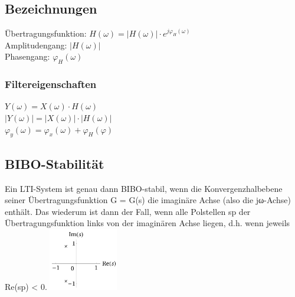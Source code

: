 \begin{multicols}{2}
    \subsection{Bezeichnungen}
    Übertragungsfunktion: $H(\omega)=|H(\omega)| \cdot e^{j\varphi_H(\omega)}$ \\
    Amplitudengang: $|H(\omega)|$ \\
    Phasengang: $\varphi_H(\omega)$ \\

    \subsubsection{Filtereigenschaften}
    $Y(\omega) = X(\omega) \cdot H(\omega)$ \\
    $|Y(\omega)| = |X(\omega)| \cdot |H(\omega)|$ \\
    $\varphi_y(\omega) = \varphi_x(\omega) + \varphi_H(\varphi)$

    \subsection{BIBO-Stabilität}
    Ein LTI-System ist genau dann BIBO-stabil, wenn die Konvergenzhalbebene seiner Übertragungsfunktion G = G(s) die imaginäre Achse (also die jω-Achse) enthält.
Das wiederum ist dann der Fall, wenn alle Polstellen sp der Übertragungsfunktion links von
der imaginären Achse liegen, d.h. wenn jeweils Re(sp) < 0.
\includegraphics[width = 3cm]{include/Integraltransformationen/img/BiBo.png}

\end{multicols}
